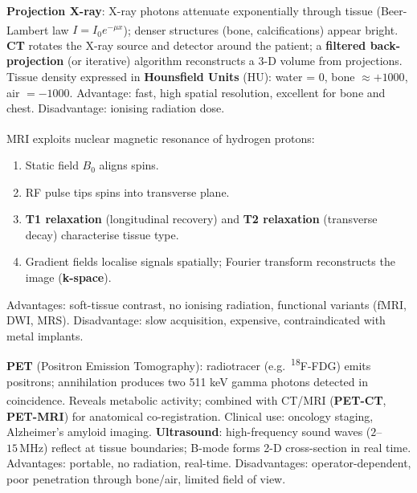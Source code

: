 \begin{tcbitemize}[ skin=sectionraster ]
    \tcbitem[title={X-Ray and Computed Tomography}, raster multicolumn=3]
    \textbf{Projection X-ray}: X-ray photons attenuate exponentially through tissue (Beer-Lambert law $I = I_0 e^{-\mu x}$); denser structures (bone, calcifications) appear bright\textsuperscript{\cite[][pp.~135--180]{bushbergEssentialPhysicsMedicalImaging2020}}.
    \tcblower
    \textbf{CT} rotates the X-ray source and detector around the patient; a \textbf{filtered back-projection} (or iterative) algorithm reconstructs a 3-D volume from projections.
    Tissue density expressed in \textbf{Hounsfield Units} (HU): water = 0, bone $\approx +1000$, air $= -1000$.
    Advantage: fast, high spatial resolution, excellent for bone and chest.
    Disadvantage: ionising radiation dose.

    \tcbitem[title={Magnetic Resonance Imaging (MRI)}, raster multicolumn=3]
    MRI exploits nuclear magnetic resonance of hydrogen protons\textsuperscript{\cite[][pp.~270--320]{bushbergEssentialPhysicsMedicalImaging2020}}:
    \begin{enumerate}
        \item Static field $B_0$ aligns spins.
        \item RF pulse tips spins into transverse plane.
        \item \textbf{T1 relaxation} (longitudinal recovery) and \textbf{T2 relaxation} (transverse decay) characterise tissue type.
        \item Gradient fields localise signals spatially; Fourier transform reconstructs the image (\textbf{k-space}).
    \end{enumerate}
    Advantages: soft-tissue contrast, no ionising radiation, functional variants (fMRI, DWI, MRS).
    Disadvantage: slow acquisition, expensive, contraindicated with metal implants.

    \tcbitem[title={PET and Ultrasound}, raster multicolumn=3]
    \textbf{PET} (Positron Emission Tomography): radiotracer (e.g.\ \textsuperscript{18}F-FDG) emits positrons; annihilation produces two 511 keV gamma photons detected in coincidence\textsuperscript{\cite[][pp.~590--630]{bushbergEssentialPhysicsMedicalImaging2020}}.
    Reveals metabolic activity; combined with CT/MRI (\textbf{PET-CT}, \textbf{PET-MRI}) for anatomical co-registration.
    Clinical use: oncology staging, Alzheimer's amyloid imaging.
    \tcblower
    \textbf{Ultrasound}: high-frequency sound waves ($2$--$15\,\text{MHz}$) reflect at tissue boundaries; B-mode forms 2-D cross-section in real time.
    Advantages: portable, no radiation, real-time. Disadvantages: operator-dependent, poor penetration through bone/air, limited field of view.


\end{tcbitemize}
